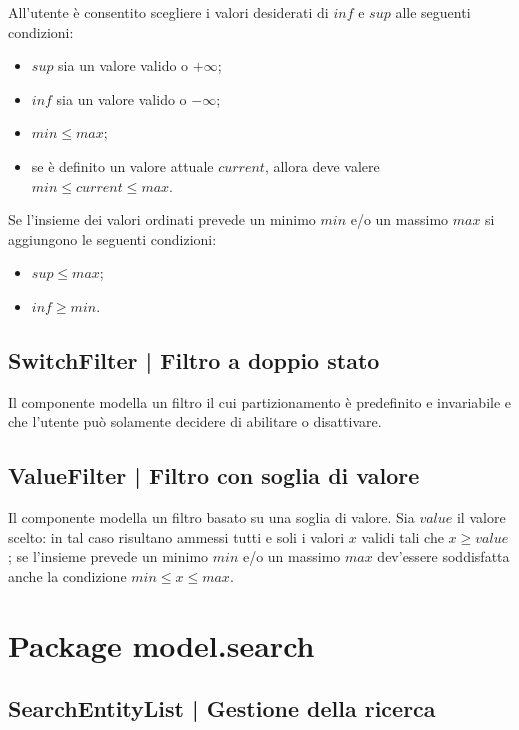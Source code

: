\documentclass[10pt,a4paper,headinclude,footinclude,hidelinks]{scrreprt} %
\begin{document}
	All'utente è consentito scegliere i valori desiderati di $inf$ e $sup$ alle seguenti condizioni:
	\begin{itemize}
	\item $sup$ sia un valore valido o $+\infty$;
	\item $inf$ sia un valore valido o $-\infty$;
	\item $min \leq max$;
	\item se è definito un valore attuale $current$, allora deve valere $min \leq current \leq max$.
	\end{itemize}

	Se l'insieme dei valori ordinati prevede un minimo $min$ e/o un massimo $max$ si aggiungono le seguenti condizioni:
	\begin{itemize}
	\item $sup \leq max$;
	\item $inf \geq min$.
	\end{itemize}

	\subsection[SwitchFilter]{SwitchFilter | Filtro a doppio stato}
	\label{sec:stage:design:sistema:model.filter:switch-filter}
	Il componente modella un filtro il cui partizionamento è predefinito e invariabile e che l'utente può solamente decidere di abilitare o disattivare.

	\subsection[ValueFilter]{ValueFilter | Filtro con soglia di valore}
	\label{sec:stage:design:sistema:model.filter:value-filter}
	Il componente modella un filtro basato su una soglia di valore. Sia $value$ il valore scelto: in tal caso risultano ammessi tutti e soli i valori $x$ validi tali che $x \geq value$; se l'insieme prevede un minimo $min$ e/o un massimo $max$ dev'essere soddisfatta anche la condizione $min \leq x \leq max$.

	\section{Package model.search}
	\label{sec:stage:design:sistema:model.search}

	\subsection[SearchEntityList]{SearchEntityList | Gestione della ricerca}
	\label{sec:stage:design:sistema:model.search:search-entity-list}
\end{document}
